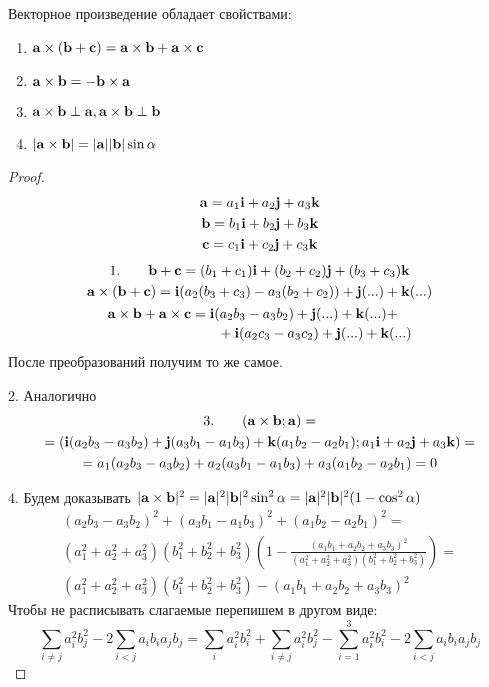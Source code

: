 \begin{theorem}
    Векторное произведение обладает свойствами:
    \begin{enumerate}
        \item $\mathbf{a} \times (\mathbf{b} + \mathbf{c}) = \mathbf{a} \times \mathbf{b} + \mathbf{a} \times \mathbf{c}$
        \item $\mathbf{a} \times \mathbf{b} = -\mathbf{b} \times \mathbf{a}$
        \item $\mathbf{a} \times \mathbf{b} \perp \mathbf{a}, \mathbf{a} \times \mathbf{b} \perp \mathbf{b}$
        \item $|\mathbf{a} \times \mathbf{b}| = |\mathbf{a}||\mathbf{b}|\sin\alpha$
    \end{enumerate}
\end{theorem}
\begin{proof}
    \begin{gather*}
        \mathbf{a} = a_1 \mathbf{i} + a_2 \mathbf{j} + a_3 \mathbf{k}\\
        \mathbf{b} = b_1 \mathbf{i} + b_2 \mathbf{j} + b_3 \mathbf{k}\\
        \mathbf{c} = c_1 \mathbf{i} + c_2 \mathbf{j} + c_3 \mathbf{k}
    \end{gather*}
    \begin{gather*}
        1. \qquad \vb+\vc = (b_1 + c_1) \vi + (b_2+c_2) \vj + (b_3+c_3)\vk\\
        \va \times (\vb+\vc) = \vi (a_2(b_3+c_3) - a_3 (b_2+c_2))+\vj(...)+\vk(...)\\
        \begin{multlined}
            \va \times \vb + \va \times \vc = \vi (a_2 b_3 - a_3 b_2)+\vj(...)+\vk(...)+\\
            +\vi (a_2 c_3 - a_3 c_2)+\vj(...)+\vk(...)
        \end{multlined}
    \end{gather*}
    После преобразований получим то же самое.

    2. Аналогично
    \begin{multline*}
        3. \qquad (\mathbf{a}\times\mathbf{b}; \mathbf{a}) = \\
        = (\mathbf{i} (a_2 b_3 - a_3 b_2)+ \mathbf{j} (a_3 b_1 - a_1 b_3) + \mathbf{k} (a_1 b_2 - a_2 b_1);
        a_1 \mathbf{i} + a_2 \mathbf{j} + a_3 \mathbf{k}) = \\
        =a_1 (a_2 b_3 - a_3 b_2)+ a_2 (a_3 b_1 - a_1 b_3) + a_3 (a_1 b_2 - a_2 b_1) = 0
    \end{multline*}

    4. Будем доказывать
    $|\mathbf{a} \times \mathbf{b}|^2 = |\mathbf{a}|^2 |\mathbf{b}|^2 \sin^2 \alpha = |\mathbf{a}|^2 |\mathbf{b}|^2 (1 - \cos^2 \alpha)$
    \begin{multline*}
        (a_2 b_3 - a_3 b_2)^2+(a_3 b_1 - a_1 b_3)^2+(a_1 b_2 - a_2 b_1)^2 =\\
        (a_1^2 + a_2^2 + a_3^2)(b_1^2 + b_2^2 + b_3^2)\left(1 -
        \frac{(a_1 b_1 + a_2 b_2 + a_3 b_3)^2}{(a_1^2 + a_2^2 + a_3^2)(b_1^2 + b_2^2 + b_3^2)}\right)=\\
        (a_1^2 + a_2^2 + a_3^2)(b_1^2 + b_2^2 + b_3^2) - (a_1 b_1 + a_2 b_2 + a_3 b_3)^2
    \end{multline*}
    Чтобы не расписывать слагаемые перепишем в другом виде:
    \[\sum_{i\neq j} a_i^2 b_j^2 - 2 \sum_{i<j} a_i b_i a_j b_j =
        \sum_i a_i^2 b_i^2 + \sum_{i \neq j} a_i^2 b_j^2
        - \sum_{i=1}^3 a_i^2 b_i^2 - 2 \sum_{i<j} a_i b_i a_j b_j\]
\end{proof}


